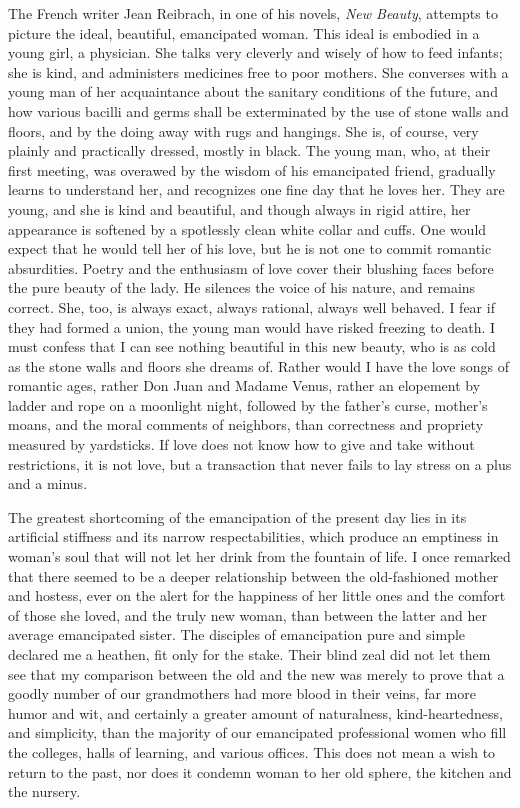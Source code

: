 The French writer Jean Reibrach, in one of his novels, \textit{New
Beauty}, attempts to picture the ideal, beautiful, emancipated woman.
This ideal is embodied in a young girl, a physician. She talks very
cleverly and wisely of how to feed infants; she is kind, and
administers medicines free to poor mothers. She converses with a young
man of her acquaintance about the sanitary conditions of the future,
and how various bacilli and germs shall be exterminated by the use of
stone walls and floors, and by the doing away with rugs and hangings.
She is, of course, very plainly and practically dressed, mostly in
black. The young man, who, at their first meeting, was overawed by the
wisdom of his emancipated friend, gradually learns to understand her,
and recognizes one fine day that he loves her. They are young, and she
is kind and beautiful, and though always in rigid attire, her
appearance is softened by a spotlessly clean white collar and cuffs.
One would expect that he would tell her of his love, but he is not one
to commit romantic absurdities. Poetry and the enthusiasm of love
cover their blushing faces before the pure beauty  of the
lady. He silences the voice of his nature, and remains correct. She,
too, is always exact, always rational, always well behaved. I fear if
they had formed a union, the young man would have risked freezing to
death. I must confess that I can see nothing beautiful in this new
beauty, who is as cold as the stone walls and floors she dreams of.
Rather would I have the love songs of romantic ages, rather Don Juan
and Madame Venus, rather an elopement by ladder and rope on a
moonlight night, followed by the father's curse, mother's moans, and
the moral comments of neighbors, than correctness and propriety
measured by yardsticks. If love does not know how to give and take
without restrictions, it is not love, but a transaction that never
fails to lay stress on a plus and a minus.

The greatest shortcoming of the emancipation of the present day lies
in its artificial stiffness and its narrow respectabilities, which
produce an emptiness in woman's soul that will not let her drink from
the fountain of life. I once remarked that there seemed to be a deeper
relationship between the old-fashioned mother and hostess, ever on the
alert for the happiness of her little ones and the comfort of those
she loved, and the truly new woman, than between the latter and her
average emancipated sister. The disciples of emancipation pure and
simple declared me a heathen, fit only for the stake. Their blind zeal
did not let them see that my comparison between the old and the new
was merely to prove that a goodly number of our grandmothers had more
blood in their veins, far more humor and wit, and certainly 
a greater amount of naturalness, kind-heartedness, and simplicity,
than the majority of our emancipated professional women who fill the
colleges, halls of learning, and various offices. This does not mean a
wish to return to the past, nor does it condemn woman to her old
sphere, the kitchen and the nursery.

